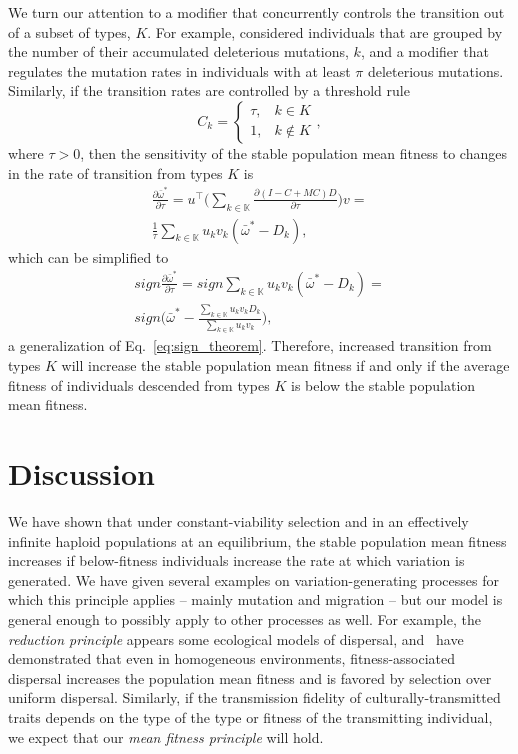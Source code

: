 \documentclass[9pt, a4paper, twocolumn]{extarticle}
\newcommand*{\tr}{^\intercal}
\begin{document}

We turn our attention to a modifier that concurrently controls the transition out of a subset of types, $K$.
For example, \citet[Appendix~B]{Ram2012} considered individuals that are grouped by the number of their accumulated deleterious mutations, $k$, and a modifier that regulates the mutation rates in individuals with at least $\pi$ deleterious mutations.
Similarly, if the transition rates are controlled by a threshold rule 
\begin{equation}
C_k = \begin{cases}
\tau, & k \in K \\
1, & k \not\in K
\end{cases},
\end{equation}
where $\tau > 0$, then the sensitivity of the stable population mean fitness to changes in the
rate of transition from types $K$ is
\begin{equation}
\begin{aligned}
\frac{\partial \bar{\omega}^*}{\partial \tau} = 
u\tr \Big( \sum_{k \in \mathbb{K{}}}{\frac{\partial (I - C + MC)D}{\partial \tau}} \Big) v = \\
\frac{1}{\tau} \sum_{k \in \mathbb{K}}{u_k v_k (\bar{\omega}^* - D_k)},
\end{aligned}
\end{equation}
which can be simplified to
\begin{multline}\label{eq:sign_theorem_threshold}
sign \frac{\partial \bar{\omega}^*}{\partial \tau} = 
sign \sum_{k \in \mathbb{K}}{u_k v_k (\bar{\omega}^* - D_k)} = \\ 
sign \Big(\bar{\omega}^* - \frac{\sum_{k \in \mathbb{K}}{u_k v_k D_k}}{\sum_{k \in \mathbb{K}}{u_k v_k}}\Big), 
\end{multline}
a generalization of Eq.~\ref{eq:sign_theorem}.
Therefore, increased transition from types $K$ will increase the stable population mean fitness if and only if the average fitness of individuals descended from types $K$ is below the stable population mean fitness.

\section*{Discussion}

We have shown that under constant-viability selection and in an effectively infinite haploid populations at an equilibrium, the stable population mean fitness increases if below-fitness individuals increase the rate at which variation is generated.
We have given several examples on variation-generating processes for which this principle applies -- mainly mutation and migration -- but our model is general enough to possibly apply to other processes as well.
For example, the \emph{reduction principle} appears some ecological models of dispersal, and~\citet{Gueijman2013} have demonstrated that even in homogeneous environments, fitness-associated dispersal increases the population mean fitness and is favored by selection over uniform dispersal.
Similarly, if the transmission fidelity of culturally-transmitted traits depends on the type of the type or fitness of the transmitting individual, we expect that our \emph{mean fitness principle} will hold.
\end{document}
